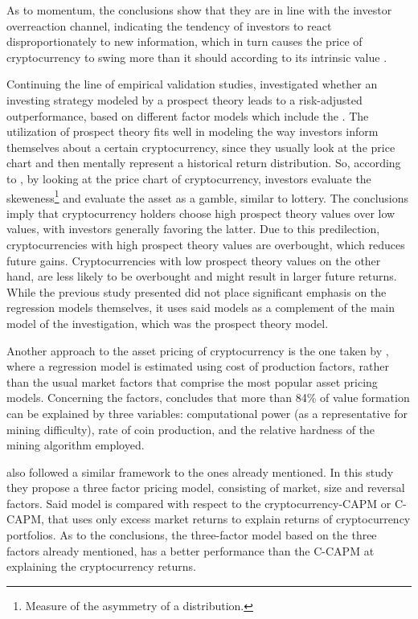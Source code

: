 As to momentum, the conclusions show that they are in line with the investor overreaction channel, indicating the tendency of investors to react disproportionately to new information, which in turn causes the price of cryptocurrency to swing more than it should according to its intrinsic value \parencite{10.1371/journal.pone.0264522}.

Continuing the line of empirical validation studies, \parencite{thoma2020prospect} investigated whether an investing strategy modeled by a prospect theory leads to a risk-adjusted outperformance, based on different factor models which include the \parencite{fama1993}. The utilization of prospect theory fits well in modeling the way investors inform themselves about a certain cryptocurrency, since they usually look at the price chart and then mentally represent a historical return distribution. So, according to \parencite{thoma2020prospect}, by looking at the price chart of cryptocurrency, investors evaluate the skeweness\footnote{Measure of the asymmetry of a distribution.} and evaluate the asset as a gamble, similar to lottery. The conclusions imply that cryptocurrency holders choose high prospect theory values over low values, with investors generally favoring the latter. Due to this predilection, cryptocurrencies with high prospect theory values are overbought, which reduces future gains. Cryptocurrencies with low prospect theory values on the other hand, are less likely to be overbought and might result in larger future returns. While the previous study presented did not place significant emphasis on the regression models themselves, it uses said models as a complement of the main model of the investigation, which was the prospect theory model.

Another approach to the asset pricing of cryptocurrency is the one taken by \parencite{HAYES20171308}, where a regression model is estimated using cost of production factors, rather than the usual market factors that comprise the most popular asset pricing models. Concerning the factors, \parencite{HAYES20171308} concludes that more than 84\% of value formation can be explained by three variables: computational power (as a representative for mining difficulty), rate of coin production, and the relative hardness of the mining algorithm employed.

\parencite{Shen2020} also followed a similar framework to the ones already mentioned. In this study they propose a three factor pricing model, consisting of market, size and reversal factors. Said model is compared with respect to the cryptocurrency-CAPM or C-CAPM, that uses only excess market returns to explain returns of cryptocurrency portfolios. As to the conclusions, the three-factor model based on the three factors already mentioned, has a better performance than the C-CAPM at explaining the cryptocurrency returns.

